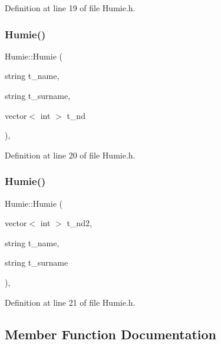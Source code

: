 Definition at line 19 of file Humie.\+h.

\mbox{\label{class_humie_aaf022723e87d5b942b75ac0f3886040f}} 
\subsubsection{\texorpdfstring{Humie()}{Humie()}\hspace{0.1cm}{\footnotesize\ttfamily [2/3]}}
{\footnotesize\ttfamily Humie\+::\+Humie (\begin{DoxyParamCaption}\item[{string}]{t\+\_\+name,  }\item[{string}]{t\+\_\+surname,  }\item[{vector$<$ int $>$}]{t\+\_\+nd }\end{DoxyParamCaption})\hspace{0.3cm}{\ttfamily [inline]}, {\ttfamily [protected]}}



Definition at line 20 of file Humie.\+h.

\mbox{\label{class_humie_a81c0810d76013148334772fbcaceaf93}} 
\subsubsection{\texorpdfstring{Humie()}{Humie()}\hspace{0.1cm}{\footnotesize\ttfamily [3/3]}}
{\footnotesize\ttfamily Humie\+::\+Humie (\begin{DoxyParamCaption}\item[{vector$<$ int $>$}]{t\+\_\+nd2,  }\item[{string}]{t\+\_\+name,  }\item[{string}]{t\+\_\+surname }\end{DoxyParamCaption})\hspace{0.3cm}{\ttfamily [inline]}, {\ttfamily [protected]}}



Definition at line 21 of file Humie.\+h.



\subsection{Member Function Documentation}
\mbox{\label{class_humie_a1bfe9cf46655ca5952b83c1652d8c0a1}} 
